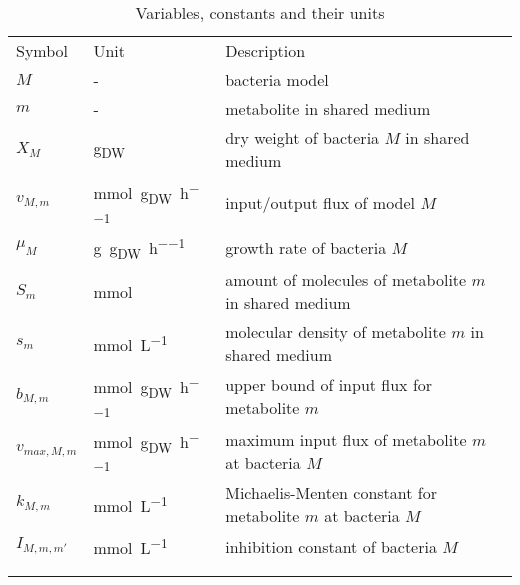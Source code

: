 \section{}
\begin{table}[]
\centering
\caption{Variables, constants and their units}
\label{tab:units_of_variables_and_constants}
\begin{tabular}{lll}
\rowcolor[HTML]{EFEFEF} 
Symbol                 & Unit    & Description\\
$M$                    & -       & bacteria model\\
$m$                    & -       & metabolite in shared medium\\
$X_M$                  & \si{\gram_{DW}} & dry weight of bacteria $M$ in shared medium\\
$v_{M,m}$              & \si{\milli\mole\per\gram_{DW}\per\hour} & input/output flux of model $M$\\
$\mu_M$                & \si{\gram\per\gram_{DW}\per\hour} & growth rate of bacteria $M$\\
$S_m$                  & \si{\milli\mole} & amount of molecules of metabolite $m$ in shared medium\\
$s_m$                  & \si{\milli\mole\per\liter} & molecular density of metabolite $m$ in shared medium\\
$b_{M,m}$              & \si{\milli\mole\per\gram_{DW}\per\hour} & upper bound of input flux for metabolite $m$\\
$v_{max,M,m}$          & \si{\milli\mole\per\gram_{DW}\per\hour} & maximum input flux of metabolite $m$ at bacteria $M$\\
$k_{M,m}$              & \si{\milli\mole\per\liter} & Michaelis-Menten constant for metabolite $m$ at bacteria $M$\\
$I_{M,m,m'}$           & \si{\milli\mole\per\liter} & inhibition constant of bacteria $M$\\
 &&\\
 &&\\

\end{tabular}
\end{table}

